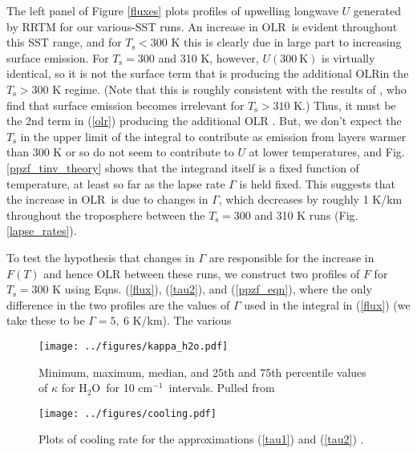 \documentclass[10pt]{article}
\newcommand{\eqnref}[1]{(\ref{#1})}
\newcommand{\htwo}{\ensuremath{\mathrm{H_2O}}}
\newcommand{\OLR}{\ensuremath{\mathrm{OLR}}}
\newcommand{\cminverse}{\ensuremath{\mathrm{cm^{-1}}}}
\newcommand{\Ts}{\ensuremath{T_\mathrm{s}}}
\begin{document}
The left panel of Figure \ref{fluxes} plots profiles of upwelling longwave $U$ generated by RRTM for our various-SST runs. An increase in \OLR\ is evident throughout this SST range, and for $\Ts< 300 $ K this is clearly due in large part to increasing surface emission. For $\Ts =300$ and 310 K, however,  $U(300\ \mathrm{K})$ is virtually identical, so it is not the surface term that is producing the additional \OLR in the $\Ts > 300 $ K regime. (Note that this is roughly consistent with the results of \cite{goldblatt2013}, who find that surface emission becomes irrelevant for $\Ts >310$ K.)   Thus, it must be the 2nd term in \eqnref{olr} producing the additional OLR . But, we don't expect the $\Ts$ in the upper limit of the integral to contribute as emission from layers warmer than $300$ K or so do not seem to contribute to $U$ at lower temperatures, and Fig. \ref{ppzf_tinv_theory}
shows that the integrand itself is a fixed function of temperature, at least so far as the lapse rate $\Gamma$ is held fixed. This suggests that the increase in \OLR\ is due to changes in $\Gamma$, which decreases by roughly 1 K/km throughout the troposphere between the $\Ts = 300$ and 310 K runs (Fig. \ref{lapse_rates}).

To test the hypothesis that changes in $\Gamma$ are responsible for the increase in $F(T)$ and hence OLR between these runs, we construct two profiles of $F$ for  $\Ts=300$ K using Eqns. \eqnref{flux}, \eqnref{tau2}, and \eqnref{ppzf_eqn}, where the only difference in the two profiles are the values of $\Gamma$ used in the integral in \eqnref{flux} (we take these to be $\Gamma =5,\ 6$ K/km). The various


	
\pagebreak

\begin{figure}[h]
	\begin{center}
			\texttt{[image: ../figures/kappa\_h2o.pdf]}
		\caption{Minimum, maximum, median, and 25th and 75th percentile values of $\kappa$ for \htwo\ for 10 \cminverse\ intervals. Pulled from \cite{pierrehumbert2010}
		\label{kappa_h2o}
		}
	\end{center}
\end{figure}

\begin{figure}[h]
	\begin{center}
			\texttt{[image: ../figures/cooling.pdf]}
		\caption{Plots of cooling rate for the approximations  \eqnref{tau1} and \eqnref{tau2} .
		\label{cooling_fig}
		}
	\end{center}
\end{figure}
\end{document}
